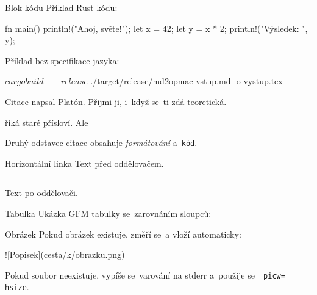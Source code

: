 \sec Blok kódu
Příklad Rust kódu:

\begtt
fn main() {
    println!("Ahoj, světe!");
    let x = 42;
    let y = x * 2;
    println!("Výsledek: {}", y);
}
\endtt

Příklad bez specifikace jazyka:

\begtt
$ cargo build --release
$ ./target/release/md2opmac vstup.md -o vystup.tex
\endtt


\sec Citace
\begcitation
{} napsal Platón.
Přijmi ji, i~když se~ti zdá teoretická.

\endcitation

\begcitation
{} říká staré přísloví.
Ale 

\endcitation

\begcitation
Druhý odstavec citace obsahuje {\it formátování} a~{\tt kód}.

\endcitation


\sec Horizontální linka
Text před oddělovačem.

\noindent\hrule

Text po oddělovači.


\sec Tabulka
Ukázka GFM tabulky se~zarovnáním sloupců:



\sec Obrázek
Pokud obrázek existuje, změří se~a vloží automaticky:

\begtt
![Popisek](cesta/k/obrazku.png)
\endtt

Pokud soubor neexistuje, vypíše se~varování na stderr a~použije se~{\tt {} picw= hsize}.


\bye
